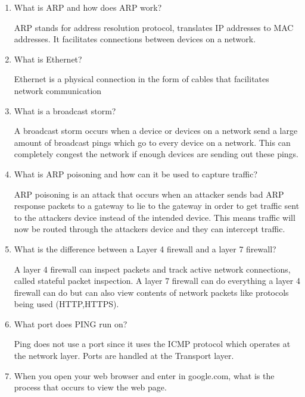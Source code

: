 \documentclass{exam}
\begin{document}
\begin{enumerate}
\begin{solution}
\begin{enumerate}
				
			\end{enumerate}
		\end{solution}
		\item What is ARP and how does ARP work?
		\begin{solution}
			ARP stands for address resolution protocol, translates IP addresses to MAC addresses. It facilitates connections between devices on a network.
		\end{solution}
		\item What is Ethernet?
		\begin{solution}
			Ethernet is a physical connection in the form of cables that facilitates network communication 
		\end{solution}
		\item What is a broadcast storm?
		\begin{solution}
			A broadcast storm occurs when a device or devices on a network send a large amount of broadcast pings which go to every device on a network. This can completely congest the network if enough devices are sending out these pings. 
		\end{solution}
		\item What is ARP poisoning and how can it be used to capture traffic? 
		\begin{solution}
			ARP poisoning is an attack that occurs when an attacker sends bad ARP response packets to a gateway to lie to the gateway in order to get traffic sent to the attackers device instead of the intended device. This means traffic will now be routed through the attackers device and they can intercept traffic. 
		\end{solution}
		\item What is the difference between a Layer 4 firewall and a layer 7 firewall? 
		\begin{solution}
			A layer 4 firewall can inspect packets and track active network connections, called stateful packet inspection. A layer 7 firewall can do everything a layer 4 firewall can do but can also view contents of network packets like protocols being used (HTTP,HTTPS).  
		\end{solution}
		\item What port does PING run on? 
		\begin{solution}
			Ping does not use a port since it uses the ICMP protocol which operates at the network layer. Ports are handled at the Transport layer. 
		\end{solution}
		\item When you open your web browser and enter in google.com, what is the process that occurs to view the web page. 

\end{enumerate}
\end{document}
